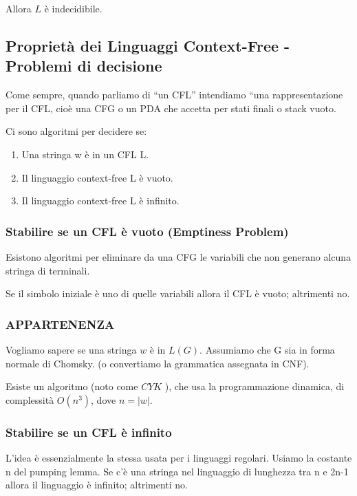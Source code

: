 Allora $L$ è indecidibile.

\subsection{Proprietà dei Linguaggi
Context-Free - 
Problemi di decisione}

Come sempre, quando parliamo di “un
CFL” intendiamo “una rappresentazione
per il CFL, cioè una CFG o un PDA che
accetta per stati finali o stack vuoto.

Ci sono algoritmi per decidere se:
\begin{enumerate}
    \item Una stringa w è in un CFL L.
    \item Il linguaggio context-free L è vuoto.
    \item Il linguaggio context-free L è infinito.
\end{enumerate}

\subsubsection{Stabilire se un CFL è vuoto
(Emptiness Problem)}

Esistono algoritmi per eliminare da una
CFG le variabili che non generano
alcuna stringa di terminali.

Se il simbolo iniziale è uno di quelle
variabili allora il CFL è vuoto; altrimenti
no.

\subsubsection{APPARTENENZA}

Vogliamo sapere se una stringa $w$ è in $L(G) .$ Assumiamo che G sia in forma normale di Chomsky.
(o convertiamo la grammatica assegnata in CNF).

Esiste un algoritmo (noto come $C Y K$ ), che usa la programmazione dinamica, di complessità $O\left(n^{3}\right)$, dove $n=|w|$.

\subsubsection{Stabilire se un CFL è infinito}

L’idea è essenzialmente la stessa usata
per i linguaggi regolari. 
Usiamo la costante n del pumping
lemma. Se c’è una stringa nel linguaggio di
lunghezza tra n e 2n-1 allora il
linguaggio è infinito; altrimenti no.

